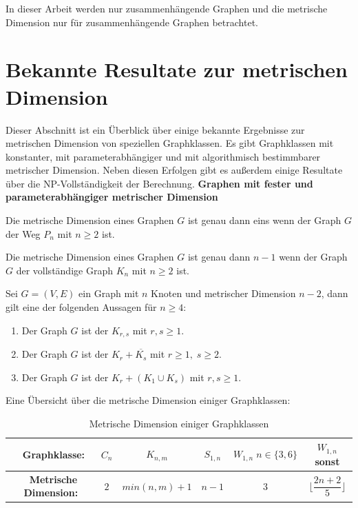 \begin{bem}
In dieser Arbeit werden nur zusammenhängende Graphen und die metrische Dimension nur für zusammenhängende Graphen betrachtet.
\end{bem}
\newpage
\section{Bekannte Resultate zur metrischen Dimension}
\vspace{-2mm}
Dieser Abschnitt ist ein Überblick über einige bekannte Ergebnisse zur metrischen Dimension von speziellen Graphklassen. Es gibt Graphklassen mit konstanter, mit parameterabhängiger und mit algorithmisch bestimmbarer metrischer Dimension.\newline
Neben diesen Erfolgen gibt es außerdem einige Resultate über die NP-Vollständigkeit der Berechnung.\newline\newline
{\textbf{Graphen mit fester und parameterabhängiger metrischer Dimension}}
\begin{lem}
\label{path}\cite{landmarks}
Die metrische Dimension eines Graphen $G$ ist genau dann eins wenn der Graph $G$ der Weg $P_n$ mit $n\geq 2$ ist.
\end{lem}
\begin{lem}
\label{complete}\cite{upper}
Die metrische Dimension eines Graphen $G$ ist genau dann $n-1$ wenn der Graph $G$ der vollständige Graph $K_n$ mit $n\geq 2$ ist.
\end{lem}
\begin{lem}\cite{upper}
Sei $G = (V, E)$ ein Graph mit $n$ Knoten und metrischer Dimension $n-2$, dann gilt eine der folgenden Aussagen für $n\geq 4$:
\begin{enumerate}
\item Der Graph $G$ ist der $K_{r,s}$ mit $r,s \geq 1$.
\item Der Graph $G$ ist der $K_{r}+ \overline{K_s}$ mit $r \geq 1,\;s \geq 2$.
\item Der Graph $G$ ist der $K_r+(K_1 \cup K_s)$ mit $r,s \geq 1$.
\end{enumerate}
\end{lem}
Eine Übersicht über die metrische Dimension einiger Graphklassen:
  \begin{table}[htb]
     \centering
     \begin{tabularx}{\textwidth}{|c|c|c|c|c|c|}
     	\hline  
       \parbox[c][4em][c]{0pt}{~}\textbf{Graphklasse:} & $C_n$&$K_{n,m}$&$S_{1,n}$&$W_{1,n}\;n \in \{3,6\}$&$W_{1,n}$ sonst \\[1em]
		\hline       
       \parbox[c][4em][c]{0pt}{~}\textbf{Metrische Dimension:}& $2$&$min(n,m)+1$& $n-1$  &$3$  &$\lfloor \dfrac{2n+2}{5} \rfloor$        \\[1em]
       	\hline  
     \end{tabularx}
 
     \caption{Metrische Dimension einiger Graphklassen}
     \label{tbl:Metrische Dimension einiger Graphklassen}
   \end{table}
